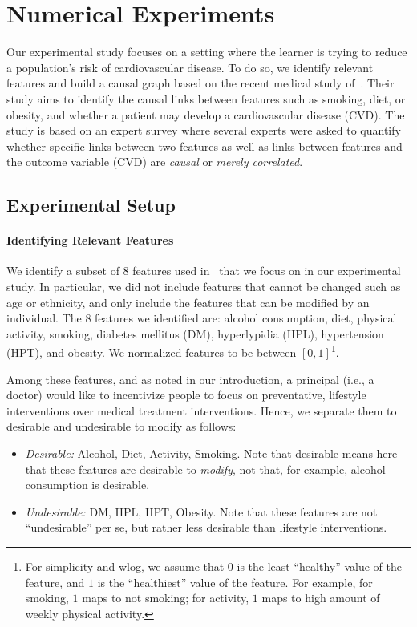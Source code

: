 \section{Numerical Experiments}\label{sec:experiments}


Our experimental study focuses on a setting where the learner is trying to reduce a population's risk of cardiovascular disease. To do so, we identify relevant features and build a causal graph based on the recent medical study of~\cite{causal_cvd}. Their study aims to identify the causal links between features such as smoking, diet, or obesity, and whether a patient may develop a cardiovascular disease (CVD). The study is based on an expert survey where several experts were asked to quantify whether specific links between two features as well as links between features and the outcome variable (CVD) are \emph{causal} or \emph{merely correlated}. 

\subsection{Experimental Setup}
\paragraph{Identifying Relevant Features} We identify a subset of 8 features used in~\cite{causal_cvd} that we focus on in our experimental study. In particular, we did not include features that cannot be changed such as age or ethnicity, and only include the features that can be modified by an individual. The 8 features we identified are: alcohol consumption, diet, physical activity, smoking, diabetes mellitus (DM), hyperlypidia (HPL), hypertension (HPT), and obesity. We normalized features to be between $[0,1]$\footnote{For simplicity and wlog, we assume that $0$ is the least ``healthy'' value of the feature, and $1$ is the ``healthiest'' value of the feature. For example, for smoking, $1$ maps to not smoking; for activity, $1$ maps to high amount of weekly physical activity.}.


Among these features, and as noted in our introduction, a principal (i.e., a doctor) would like to incentivize people to focus on preventative, lifestyle interventions over medical treatment interventions. Hence, we separate them to desirable and undesirable to modify as follows: 
\begin{itemize}
\item \emph{Desirable:} Alcohol, Diet, Activity, Smoking. Note that desirable means here that these features are desirable to \emph{modify}, not that, for example, alcohol consumption is desirable. 
\item \emph{Undesirable:} DM, HPL, HPT, Obesity. Note that these features are not ``undesirable'' per se, but rather less desirable than lifestyle interventions.
\end{itemize}

